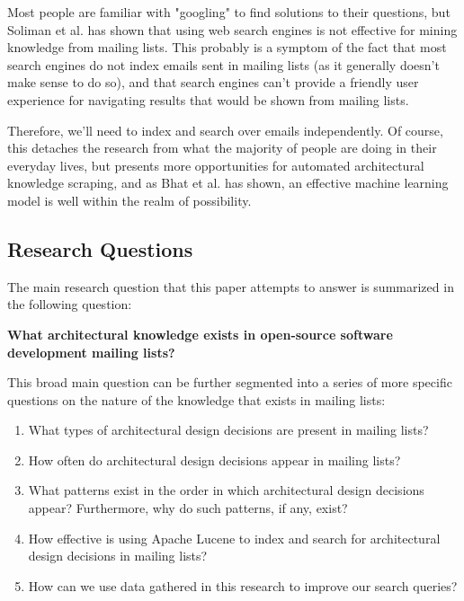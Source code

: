 \documentclass[a4paper, 12pt]{article}
\begin{document}
		Most people are familiar with "googling" to find solutions to their questions, but Soliman et al. has shown that using web search engines is not effective for mining knowledge from mailing lists\autocite{soliman}. This probably is a symptom of the fact that most search engines do not index emails sent in mailing lists (as it generally doesn't make sense to do so), and that search engines can't provide a friendly user experience for navigating results that would be shown from mailing lists.
		
		Therefore, we'll need to index and search over emails independently. Of course, this detaches the research from what the majority of people are doing in their everyday lives, but presents more opportunities for automated architectural knowledge scraping, and as Bhat et al. has shown, an effective machine learning model is well within the realm of possibility\autocite{bhat}.
		
	\newpage
	\subsection{Research Questions}
		\label{sec:research-questions}
		The main research question that this paper attempts to answer is summarized in the following question:
		
		\large \textbf{What architectural knowledge exists in open-source software development mailing lists?}
		\normalsize
		
		This broad main question can be further segmented into a series of more specific questions on the nature of the knowledge that exists in mailing lists:
		
		\begin{enumerate}
			\item What types of architectural design decisions are present in mailing lists?
			\item How often do architectural design decisions appear in mailing lists?
			\item What patterns exist in the order in which architectural design decisions appear? Furthermore, why do such patterns, if any, exist?
			\item How effective is using Apache Lucene to index and search for architectural design decisions in mailing lists?
			\item How can we use data gathered in this research to improve our search queries?
		\end{enumerate}
	
\end{document}

